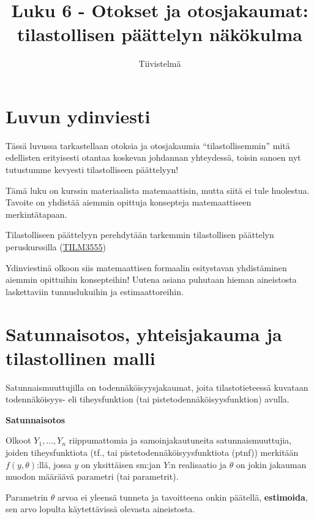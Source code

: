 \documentclass[
]{report}
\title{Luku 6 - Otokset ja otosjakaumat: tilastollisen päättelyn
näkökulma}
\subtitle{Tiivistelmä}
\author{}
\date{}
\begin{document}
\maketitle
\ifdefined\Shaded\renewenvironment{Shaded}{\begin{tcolorbox}[enhanced, frame hidden, breakable, interior hidden, boxrule=0pt, borderline west={3pt}{0pt}{shadecolor}, sharp corners]}{\end{tcolorbox}}\fi

\hypertarget{luvun-ydinviesti}{%
\section{Luvun ydinviesti}\label{luvun-ydinviesti}}

Tässä luvussa tarkastellaan otoksia ja otosjakaumia ``tilastollisemmin''
mitä edellisten erityisesti otantaa koskevan johdannan yhteydessä,
toisin sanoen nyt tutustumme kevyesti tilastolliseen päättelyyn!

Tämä luku on kurssin materiaalista matemaattisin, mutta siitä ei tule
huolestua. Tavoite on yhdistää aiemmin opittuja konsepteja
matemaattiseen merkintätapaan.

Tilastolliseen päättelyyn perehdytään tarkemmin tilastollisen päättelyn
peruskurssilla
(\href{https://opas.peppi.utu.fi/fi/opintojakso/TILM3555/1731}{TILM3555})

Ydinviestinä olkoon siis matemaattisen formaalin esitystavan
yhdistäminen aiemmin opittuihin konsepteihin! Uutena asiana puhutaan
hieman aineistosta laskettaviin tunnuslukuihin ja estimaattoreihin.

\hypertarget{satunnaisotos-yhteisjakauma-ja-tilastollinen-malli}{%
\section{Satunnaisotos, yhteisjakauma ja tilastollinen
malli}\label{satunnaisotos-yhteisjakauma-ja-tilastollinen-malli}}

Satunnaismuuttujilla on todennäköisyysjakaumat, joita tilastotieteessä
kuvataan todennäköisyys- eli tiheysfunktion (tai
pistetodennäköisyysfunktion) avulla.

\begin{defblock}{}
\textbf{Satunnaisotos}

Olkoot \(Y_1, \dots, Y_n\) riippumattomia ja samoinjakautuneita
satunnaismuuttujia, joiden tiheysfunktiota (tf., tai
pistetodennäköisyysfunktiota (ptnf)) merkitään \(f(y,\theta)\):llä,
jossa \(y\) on yksittäisen sm:jan \(Y\):n realisaatio ja \(\theta\) on
jokin jakauman muodon määräävä parametri (tai parametrit).

Parametrin \(\theta\) arvoa ei yleensä tunneta ja tavoitteena onkin
päätellä, \textbf{estimoida}, sen arvo lopulta käytettävissä olevasta
aineistosta.

\end{defblock}
\end{document}
